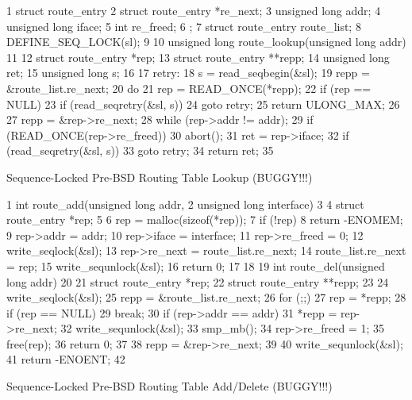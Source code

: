 \begin{listing}[tbp]
{ \scriptsize
\begin{verbbox}
 1 struct route_entry {
 2   struct route_entry *re_next;
 3   unsigned long addr;
 4   unsigned long iface;
 5   int re_freed;
 6 };
 7 struct route_entry route_list;
 8 DEFINE_SEQ_LOCK(sl);
 9
10 unsigned long route_lookup(unsigned long addr)
11 {
12   struct route_entry *rep;
13   struct route_entry **repp;
14   unsigned long ret;
15   unsigned long s;
16
17 retry:
18   s = read_seqbegin(&sl);
19   repp = &route_list.re_next;
20   do {
21     rep = READ_ONCE(*repp);
22     if (rep == NULL) {
23       if (read_seqretry(&sl, s))
24         goto retry;
25       return ULONG_MAX;
26     }
27     repp = &rep->re_next;
28   } while (rep->addr != addr);
29   if (READ_ONCE(rep->re_freed))
30     abort();
31   ret = rep->iface;
32   if (read_seqretry(&sl, s))
33     goto retry;
34   return ret;
35 }
\end{verbbox}
}
\centering
\theverbbox
\caption{Sequence-Locked Pre-BSD Routing Table Lookup (BUGGY!!!)}
\label{lst:defer:Sequence-Locked Pre-BSD Routing Table Lookup}
\end{listing}

\begin{listing}[tbp]
{ \scriptsize
\begin{verbbox}
 1 int route_add(unsigned long addr,
 2               unsigned long interface)
 3 {
 4   struct route_entry *rep;
 5
 6   rep = malloc(sizeof(*rep));
 7   if (!rep)
 8     return -ENOMEM;
 9   rep->addr = addr;
10   rep->iface = interface;
11   rep->re_freed = 0;
12   write_seqlock(&sl);
13   rep->re_next = route_list.re_next;
14   route_list.re_next = rep;
15   write_sequnlock(&sl);
16   return 0;
17 }
18
19 int route_del(unsigned long addr)
20 {
21   struct route_entry *rep;
22   struct route_entry **repp;
23
24   write_seqlock(&sl);
25   repp = &route_list.re_next;
26   for (;;) {
27     rep = *repp;
28     if (rep == NULL)
29       break;
30     if (rep->addr == addr) {
31       *repp = rep->re_next;
32       write_sequnlock(&sl);
33       smp_mb();
34       rep->re_freed = 1;
35       free(rep);
36       return 0;
37     }
38     repp = &rep->re_next;
39   }
40   write_sequnlock(&sl);
41   return -ENOENT;
42 }
\end{verbbox}
}
\centering
\theverbbox
\caption{Sequence-Locked Pre-BSD Routing Table Add/Delete (BUGGY!!!)}
\label{lst:defer:Sequence-Locked Pre-BSD Routing Table Add/Delete}
\end{listing}

